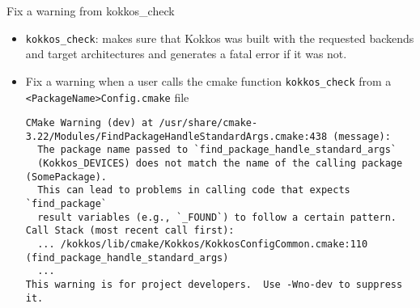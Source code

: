 %        



\begin{frame}[fragile]{Fix a warning from kokkos\_check}
 \begin{itemize}
    \item \texttt{kokkos\_check}: makes sure that Kokkos was built with the requested backends and target architectures and generates a fatal error if it was not.
    \item Fix a warning when a user calls the cmake function \texttt{kokkos\_check} from a \texttt{<PackageName>Config.cmake} file
    {\tiny \begin{verbatim}
CMake Warning (dev) at /usr/share/cmake-3.22/Modules/FindPackageHandleStandardArgs.cmake:438 (message):
  The package name passed to `find_package_handle_standard_args`
  (Kokkos_DEVICES) does not match the name of the calling package (SomePackage).
  This can lead to problems in calling code that expects `find_package`
  result variables (e.g., `_FOUND`) to follow a certain pattern.
Call Stack (most recent call first):
  ... /kokkos/lib/cmake/Kokkos/KokkosConfigCommon.cmake:110 (find_package_handle_standard_args)
  ...
This warning is for project developers.  Use -Wno-dev to suppress it.
    \end{verbatim}}
 \end{itemize}
\end{frame}



